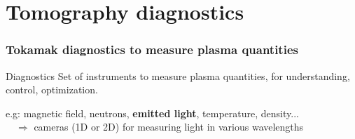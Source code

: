 \documentclass[10pt]{beamer}
\begin{document}
\section{Tomography diagnostics}


\begin{frame}
\frametitle{Tokamak diagnostics to measure plasma quantities}

\begin{alertblock}{Diagnostics}
Set of instruments to measure plasma quantities, for understanding, control, optimization.
\end{alertblock}

e.g: magnetic field, neutrons, \textbf{emitted light}, temperature, density...\\[1cm]


$\quad \Rightarrow$ cameras (1D or 2D) for measuring light in various wavelengths


%
%
%
%
%



\end{frame}


%
%
%
%
%
%
\end{document}
